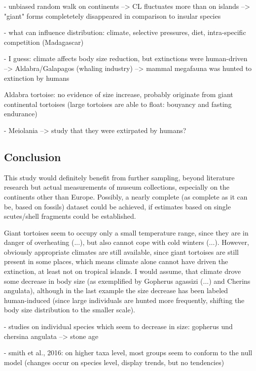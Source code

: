 - unbiased random walk on continents --> CL fluctuates more than on islands --> "giant" forms completetely disappeared in comparison to insular species

- what can influence distribution: climate, selective pressures, diet, intra-specific competition (Madagascar)

- I guess: climate affects body size reduction, but extinctions were human-driven
--> Aldabra/Galapagos (whaling industry)
--> mammal megafauna was hunted to extinction by humans





Aldabra tortoise: no evidence of size increase, probably originate from giant continental tortoises (large tortoises are able to float: bouyancy and fasting endurance)

- Meiolania --> study that they were extirpated by humans?

\subsection{Conclusion}


This study would definitely benefit from further sampling, beyond literature research but actual measurements of museum collections, especially on the continents other than Europe. Possibly, a nearly complete (as complete as it can be, based on fossils) dataset could be achieved, if estimates based on single scutes/shell fragments could be established.

Giant tortoises seem to occupy only a small temperature range, since they are in danger of overheating (...), but also cannot cope with cold winters (...). However, obviously appropriate climates are still available, since giant tortoises are still present in some places, which means climate alone cannot have driven the extinction, at least not on tropical islands.
I would assume, that climate drove some decrease in body size (as exemplified by Gopherus agassizi (...) and Cherins angulata), although in the last example the size decrease has been labeled human-induced (since large individuals are hunted more frequently, shifting the body size distribution to the smaller scale).


- studies on individual species which seem to decrease in size: gopherus und chersina angulata --> stone age

- smith et al., 2016: on higher taxa level, most groups seem to conform to the null model (changes occur on species level, display trends, but no tendencies)

